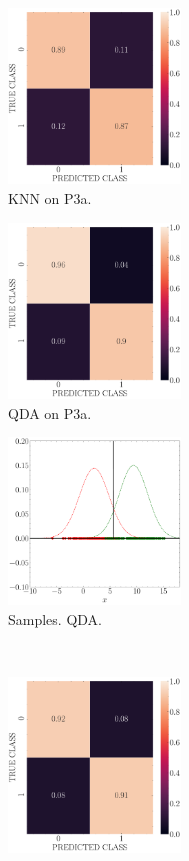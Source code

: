 \documentclass[11pt, a4 paper]{article}
\begin{document}
\begin{figure}[!htbp]
\centering
    \begin{subfigure}[!htbp]{0.24\textwidth}
       \centering
       \includegraphics[width=1.8in]{../results/ex3/conf_mtx_KNN_dataset_P3a_size_199.pdf}
       \caption{KNN on P3a.}
       \label{fig:KNN_P3a}
    \end{subfigure}
\quad    
    \begin{subfigure}[!htbp]{0.24\textwidth}
       \centering
       \includegraphics[width=1.8in]{../results/ex3/conf_mtx_QD_ML_dataset_P3a_size_199.pdf}
       \caption{QDA on P3a.}
       \label{fig:QDA_P3a}
    \end{subfigure}
\quad    
    \begin{subfigure}[!htbp]{0.24\textwidth}
       \centering
       \includegraphics[width=1.8in]{../results/ex3/samples_QD_ML_dataset_P3a_size_199.pdf}
       \caption{Samples. QDA.}
       \label{fig:DF_QDA_P3a}
    \end{subfigure}
\\
    \begin{subfigure}[!htbp]{0.24\textwidth}
       \centering
       \includegraphics[width=1.8in]{../results/ex3/conf_mtx_GMM_dataset_P3a_size_199.pdf}

\end{subfigure}
\end{figure}
\end{document}
